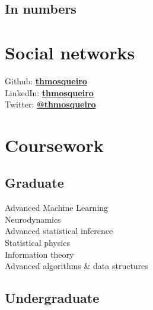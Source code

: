 \documentclass[letterpaper]{resume} %
\begin{document}
\begin{minipage}[t]{0.35\textwidth}

\sectionspace %


\subsection{In numbers}


\sectionspace %


\section{Social networks}

Github: \href{https://github.com/thmosqueiro}{\bf thmosqueiro} \\
LinkedIn: \href{https://www.linkedin.com/in/thmosqueiro}{\bf thmosqueiro} \\
Twitter: \href{https://twitter.com/thmosqueiro}{\bf @thmosqueiro} \\

\sectionspace %


\section{Coursework}

\subsection{Graduate}

Advanced Machine Learning \\
Neurodynamics \\
Advanced statistical inference \\
Statistical physics \\
Information theory \\
Advanced algorithms \& data structures \\

\sectionspace %


\subsection{Undergraduate}


\end{minipage}
\end{document}
